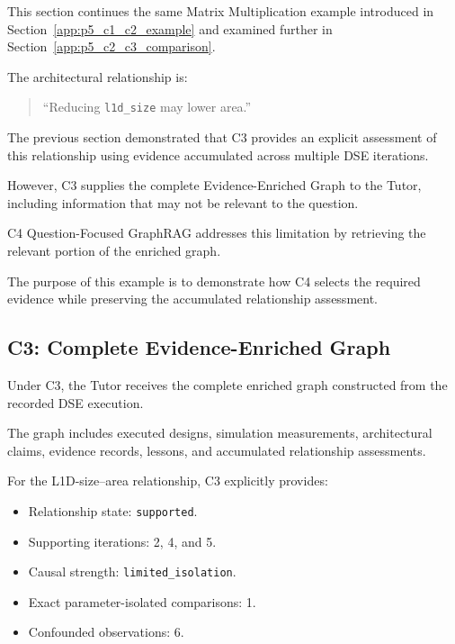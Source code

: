 This section continues the same
Matrix Multiplication example
introduced in
Section~\ref{app:p5_c1_c2_example}
and examined further in
Section~\ref{app:p5_c2_c3_comparison}.

The architectural relationship is:

\begin{quote}
``Reducing \texttt{l1d\_size}
may lower area.''
\end{quote}

The previous section demonstrated
that C3 provides an explicit
assessment of this relationship
using evidence accumulated
across multiple DSE iterations.

However, C3 supplies the complete
Evidence-Enriched Graph to the Tutor,
including information that may
not be relevant to the question.

C4 Question-Focused GraphRAG
addresses this limitation by
retrieving the relevant portion
of the enriched graph.

The purpose of this example
is to demonstrate how C4
selects the required evidence
while preserving the accumulated
relationship assessment.


\subsection{C3: Complete Evidence-Enriched Graph}

Under C3, the Tutor receives
the complete enriched graph
constructed from the recorded
DSE execution.

The graph includes executed
designs, simulation measurements,
architectural claims, evidence
records, lessons, and accumulated
relationship assessments.

For the L1D-size--area relationship,
C3 explicitly provides:

\begin{itemize}
    \item Relationship state:
    \texttt{supported}.

    \item Supporting iterations:
    2, 4, and 5.

    \item Causal strength:
    \texttt{limited\_isolation}.

    \item Exact parameter-isolated
    comparisons: 1.

    \item Confounded observations: 6.
\end{itemize}

